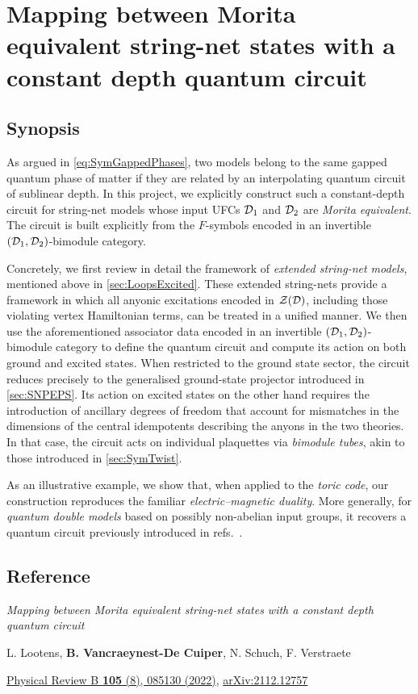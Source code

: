 \chapter{Mapping between Morita equivalent string-net states with a constant depth quantum circuit}\label{app:SN}
\section{Synopsis}
As argued in \cref{eq:SymGappedPhases}, two models belong to the same gapped quantum phase of matter if they are related by an interpolating quantum circuit of sublinear depth. In this project, we explicitly construct such a constant-depth circuit for string-net models whose input UFCs $\mathcal{D}_1$ and $\mathcal{D}_2$ are \emph{Morita equivalent}. The circuit is built explicitly from the $F$-symbols encoded in an invertible $(\mathcal{D}_1,\mathcal{D}_2)$-bimodule category.

Concretely, we first review in detail the framework of \emph{extended string-net models}, mentioned above in \cref{sec:LoopsExcited}. These extended string-nets provide a framework in which all anyonic excitations encoded in $\mathcal{Z}(\mathcal{D})$, including those violating vertex Hamiltonian terms, can be treated in a unified manner. We then use the aforementioned associator data encoded in an invertible $(\mathcal{D}_1,\mathcal{D}_2)$-bimodule category to define the quantum circuit and compute its action on both ground and excited states. When restricted to the ground state sector, the circuit reduces precisely to the generalised ground-state projector introduced in \cref{sec:SNPEPS}. Its action on excited states on the other hand requires the introduction of ancillary degrees of freedom that account for mismatches in the dimensions of the central idempotents describing the anyons in the two theories. In that case, the circuit acts on individual plaquettes via \emph{bimodule tubes}, akin to those introduced in \cref{sec:SymTwist}.

As an illustrative example, we show that, when applied to the \emph{toric code}, our construction reproduces the familiar \emph{electric–magnetic duality}. More generally, for \emph{quantum double models} based on possibly non-abelian input groups, it recovers a quantum circuit previously introduced in refs.~\cite{Buerschaper2009b,Kadar2009}.
\section{Reference}
\textit{Mapping between Morita equivalent string-net states with a constant depth quantum circuit} \par\noindent
L. Lootens, \textbf{B. Vancraeynest-De Cuiper}, N. Schuch, F. Verstraete \par\noindent
\href{https://doi.org/10.1103/PhysRevB.105.085130}{Physical Review B \textbf{105} (8), 085130 (2022)}, \href{https://doi.org/10.48550/arXiv.2112.12757}{arXiv:2112.12757}

